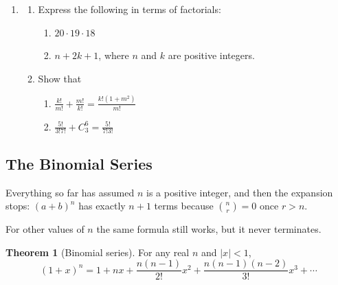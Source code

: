 \documentclass[11pt,a4paper]{article}
\theoremstyle{definition}
\newtheorem{thm}{Theorem}[section]
\begin{document}
\begin{enumerate}
\item
\begin{enumerate}
     \item Express the following in terms of factorials:
\begin{enumerate}
           \item $20\cdot 19 \cdot 18$
           \item $n+2k+1$, where $n$ and $k$ are positive integers.
\end{enumerate}     
     
     \item  Show that
\begin{enumerate}
             \item $\frac{k!}{m!}+\frac{m!}{k!}=\frac{k!(1+m^2)}{m!}$\\
             \item $\frac{5!}{3!7!}+C^6_3=\frac{5!}{7!3!}$\\
\end{enumerate}
\end{enumerate}
\end{enumerate}














\pagebreak

\subsection{The Binomial Series}
Everything so far has assumed $n$ is a positive integer, and then the expansion
stops: $(a+b)^{n}$ has exactly $n+1$ terms because $\binom{n}{r}=0$ once $r>n$.

For other values of $n$ the same formula still works, but it never terminates.

\begin{thm}[Binomial series]
For any real $n$ and $\left|x\right|<1$,
$$(1+x)^{n}=1+nx+\frac{n(n-1)}{2!}x^{2}+\frac{n(n-1)(n-2)}{3!}x^{3}+\cdots$$
\end{thm}
\end{document}
